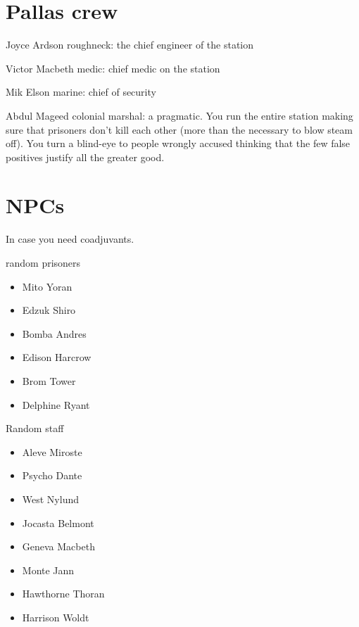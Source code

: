 \newsect


\section{Pallas crew}

\begin{rpg-commentbox}{Joyce Ardson}
    roughneck: the chief engineer of the station
\end{rpg-commentbox}

\begin{rpg-commentbox}{Victor Macbeth}
    medic: chief medic on the station
\end{rpg-commentbox}

\begin{rpg-commentbox}{Mik Elson}
    marine: chief of security 
\end{rpg-commentbox}

\begin{rpg-commentbox}{Abdul Mageed}
    colonial marshal: a pragmatic. You run the entire station making sure that prisoners don't kill each other (more than the necessary to blow steam off). You turn a blind-eye to people wrongly accused thinking that the few false positives justify all the greater good.
\end{rpg-commentbox}

\newsect

\section{NPCs}

In case you need coadjuvants.

\begin{rpg-commentbox}{random prisoners}
    \begin{itemize}
        \item Mito Yoran
        \item Edzuk Shiro
        \item Bomba Andres
        \item Edison Harcrow
        \item Brom Tower
        \item Delphine Ryant
    \end{itemize}

\end{rpg-commentbox}


\begin{rpg-commentbox}{Random staff}
    \begin{itemize}
        \item Aleve Miroste
        \item Psycho Dante
        \item West Nylund
        \item Jocasta Belmont
        \item Geneva Macbeth
        \item Monte Jann
        \item Hawthorne Thoran
        \item Harrison Woldt
    \end{itemize}

\end{rpg-commentbox}

\newsect